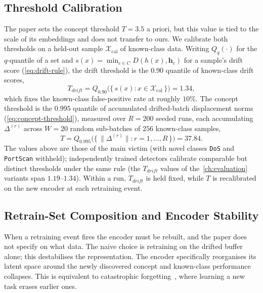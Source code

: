 \subsection{Threshold Calibration}
\label{sec:impl-calibration}
The paper sets the concept threshold $T = 3.5$ a priori, but this value is tied to the scale of its embeddings and does not transfer to ours. We calibrate both thresholds on a held-out sample $\mathcal{X}_{\mathrm{cal}}$ of known-class data. Writing $Q_q(\cdot)$ for the $q$-quantile of a set and $s(x) = \min_{c \in C} D(h(x), \bm{h}_c)$ for a sample's drift score (\cref{eq:drift-rule}), the drift threshold is the $0.90$ quantile of known-class drift scores,
\begin{equation} \label{eq:cal-tdrift}
T_{drift} = Q_{0.90}\big(\{\, s(x) : x \in \mathcal{X}_{\mathrm{cal}} \,\}\big) = 1.34,
\end{equation}
which fixes the known-class false-positive rate at roughly $10\%$. The concept threshold is the $0.995$ quantile of accumulated drifted-batch displacement norms (\cref{eq:concept-threshold}), measured over $R = 200$ seeded runs, each accumulating $\Delta^{(r)}$ across $W = 20$ random sub-batches of $256$ known-class samples,
\begin{equation} \label{eq:cal-t}
T = Q_{0.995}\big(\{\, \|\Delta^{(r)}\| : r = 1, \dots, R \,\}\big) = 37.84.
\end{equation} The values above are those of the main victim (with novel classes \texttt{DoS} and \texttt{PortScan} withheld); independently trained detectors calibrate comparable but distinct thresholds under the same rule (the $T_{drift}$ values of the~\cref{ch:evaluation} variants span $1.19$--$1.34$). Within a run, $T_{drift}$ is held fixed, while $T$ is recalibrated on the new encoder at each retraining event.

\subsection{Retrain-Set Composition and Encoder Stability}
\label{sec:impl-retrain}
When a retraining event fires the encoder must be rebuilt, and the paper does not specify on what data. The naive choice is retraining on the drifted buffer alone; this destabilises the representation. The encoder specifically reorganises its latent space around the newly discovered concept and known-class performance collapses. This is equivalent to catastrophic forgetting~\cite{French_1999}, where learning a new task erases earlier ones.

